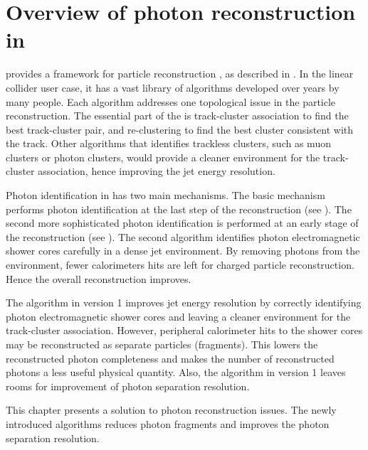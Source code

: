 
\section{Overview of photon reconstruction in \pandora}

\pandora provides a framework for particle reconstruction \cite{Marshall:2015rfa}, as described in . In the linear collider user case, it has a vast library of algorithms developed over years by many people. Each algorithm addresses one topological issue in the particle reconstruction. The essential part of the \pandora is track-cluster association  to find the best track-cluster pair, and re-clustering to find the best cluster consistent with the track. Other algorithms that identifies trackless clusters, such as muon clusters or photon clusters, would provide a cleaner environment for the track-cluster association, hence improving the jet energy resolution.

Photon identification in \pandora has two main mechanisms. The basic mechanism performs photon identification at the last step of the reconstruction  (see ). The second more sophisticated photon identification is performed at an early stage of the reconstruction  (see ). The second algorithm identifies photon electromagnetic shower cores carefully in a dense jet environment. By removing photons from the environment, fewer calorimeters hits are left for charged particle reconstruction. Hence the overall reconstruction improves.

The \PhotonReconstruction algorithm in \pandora version 1 improves jet energy resolution by correctly identifying photon electromagnetic shower cores and leaving a cleaner environment for the track-cluster association. However, peripheral calorimeter hits to the shower cores may be reconstructed as separate particles (fragments). This lowers the reconstructed photon completeness and makes the number of reconstructed photons a less useful physical quantity. Also, the algorithm in \pandora version 1 leaves rooms for improvement of photon separation resolution.

This chapter presents a solution to photon reconstruction issues. The newly introduced algorithms reduces photon fragments and improves the photon separation resolution. 

